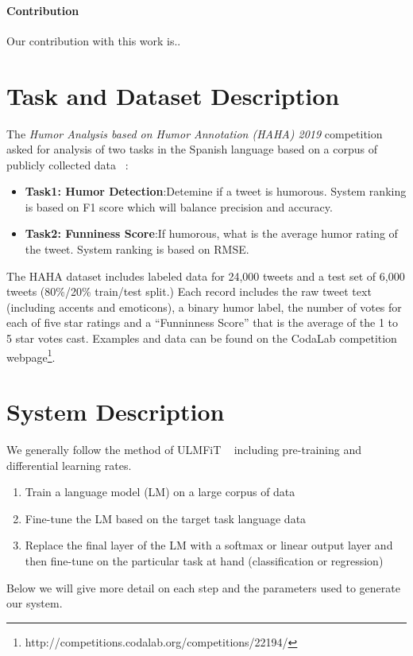 \documentclass[smallcondensed]{svjour3}     %
\begin{document}
\paragraph{Contribution} Our contribution with this work is..

\section{Task and Dataset Description}
\label{sec:task}
The \textit{Humor Analysis based on Humor Annotation (HAHA) 2019}\cite{overview_haha2019} competition asked for analysis of two tasks in the Spanish language based on a corpus of publicly collected data ~\cite{castro2018crowd}:
\begin{itemize}
\item \textbf{Task1: Humor Detection}:Detemine if a tweet is humorous. System ranking is based on F1 score which will balance precision and accuracy.
\item \textbf{Task2: Funniness Score}:If humorous, what is the average humor rating of the tweet. System ranking is based on RMSE.
\end{itemize}
The HAHA dataset includes labeled data for 24,000 tweets and a test set of 6,000 tweets (80\%/20\% train/test split.)  Each record includes the raw tweet text (including accents and emoticons), a binary humor label, the number of votes for each of five star ratings and a ``Funninness Score'' that is the average of the 1 to 5 star votes cast.  Examples and data can be found on the CodaLab competition webpage\footnote{http://competitions.codalab.org/competitions/22194/}.

\section{System Description}
\label{sec:system}
We generally follow the method of ULMFiT ~\cite{HowardRuder:DBLP:journals/corr/abs-1801-06146} including pre-training and differential learning rates. 
\begin{enumerate}
	\item Train a language model (LM) on a large corpus of data
	\item Fine-tune the LM based on the target task language data
	\item Replace the final layer of the LM with a softmax or linear output layer and then fine-tune on the particular task at hand (classification or regression)
\end{enumerate}
Below we will give more detail on each step and the parameters used to generate our system.
\end{document}
